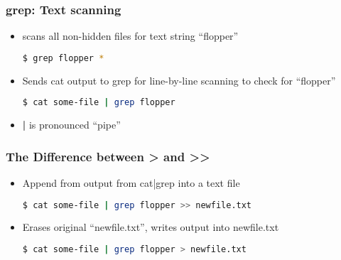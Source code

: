 \documentclass[English]{beamer}
\begin{document}
\begin{frame}[containsverbatim]
  \frametitle{grep: Text scanning}
  \begin{itemize}
  \item scans all non-hidden files for text string ``flopper''
\begin{lstlisting}[breaklines=true,language=bash]
  $ grep flopper *
\end{lstlisting}
  \item  Sends cat output to grep for line-by-line scanning to check
    for ``flopper''
\begin{lstlisting}[breaklines=true,language=bash]
  $ cat some-file | grep flopper
\end{lstlisting}
  \item \textbf{ | } is pronounced ``pipe''

  \end{itemize}

\end{frame}

\begin{frame}[containsverbatim]
 \frametitle{The Difference between > and >{}>}

 \begin{itemize}
   \item Append from output from cat|grep into a text file
\begin{lstlisting}[breaklines=true,language=bash]
  $ cat some-file | grep flopper >> newfile.txt
\end{lstlisting}
  \item Erases original ``newfile.txt'', writes output into newfile.txt 
\begin{lstlisting}[breaklines=true,language=bash]
  $ cat some-file | grep flopper > newfile.txt
\end{lstlisting}
  \end{itemize}
\end{frame}
\end{document}
